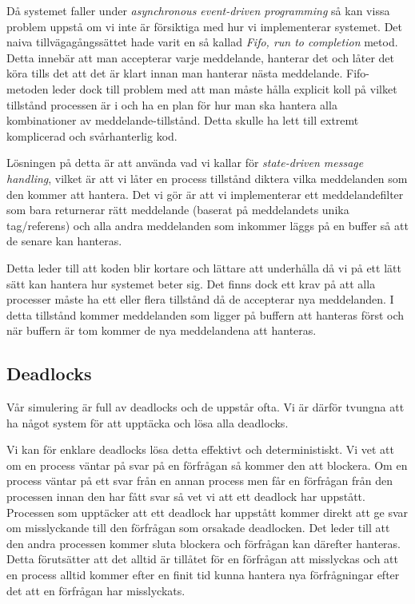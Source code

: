 Då systemet faller under \emph{ asynchronous event-driven programming} så kan vissa problem uppstå om vi inte är försiktiga med hur vi implementerar systemet. Det naiva tillvägagångssättet hade varit en så kallad \emph{Fifo, run to completion} metod. Detta innebär att man accepterar varje meddelande, hanterar det och låter det köra tills det att det är klart innan man hanterar nästa meddelande. Fifo-metoden leder dock till problem med att man måste hålla explicit koll på vilket tillstånd processen är i och ha en plan för hur man ska hantera alla kombinationer av meddelande-tillstånd. Detta skulle ha lett till extremt komplicerad och svårhanterlig kod.\citep{Reference5}

Lösningen på detta är att använda vad vi kallar för \emph{state-driven message handling}, vilket är att vi låter en process tillstånd diktera vilka meddelanden som den kommer att hantera. Det vi gör är att vi implementerar ett meddelandefilter som bara returnerar rätt meddelande (baserat på meddelandets unika tag/referens) och alla andra meddelanden som inkommer läggs på en buffer så att de senare kan hanteras.

Detta leder till att koden blir kortare och lättare att underhålla då vi på ett lätt sätt kan hantera hur systemet beter sig. Det finns dock ett krav på att alla processer måste ha ett eller flera tillstånd då de accepterar nya meddelanden. I detta tillstånd kommer meddelanden som ligger på buffern att hanteras först och när buffern är tom kommer de nya meddelandena att hanteras.


\subsection{Deadlocks}


Vår simulering är full av deadlocks och de uppstår ofta. Vi är därför tvungna att ha något system för att upptäcka och lösa alla deadlocks.

Vi kan för enklare deadlocks lösa detta effektivt och deterministiskt. Vi vet att om en process väntar på svar på en förfrågan så kommer den att blockera. Om en process väntar på ett svar från en annan process men får en förfrågan från den processen innan den har fått svar så vet vi att ett deadlock har uppstått. Processen som upptäcker att ett deadlock har uppstått kommer direkt att ge svar om misslyckande till den förfrågan som orsakade deadlocken. Det leder till att den andra processen kommer sluta blockera och förfrågan kan därefter hanteras. Detta förutsätter att det alltid är tillåtet för en förfrågan att misslyckas och att en process alltid kommer efter en finit tid kunna hantera nya förfrågningar efter det att en förfrågan har misslyckats.

